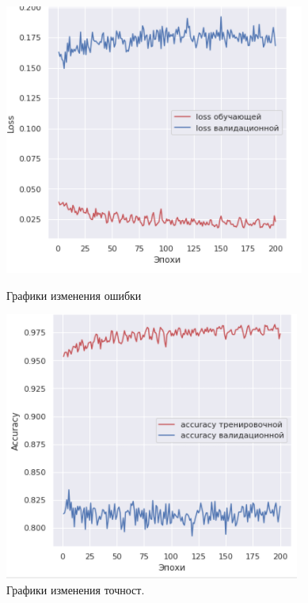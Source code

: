\documentclass[a4paper,14pt]{article}
\begin{document}
\begin{figure}[h]
\begin{center}
\begin{minipage}[h]{0.45\linewidth}
\includegraphics[width=1\linewidth]{pics/8.png}
\caption{Графики изменения ошибки}
\end{minipage}
\hfill
\begin{minipage}[h]{0.45\linewidth}
\includegraphics[width=1\linewidth]{pics/9.png}
\caption{Графики изменения точност.}
\end{minipage}
\end{center}
\end{figure}
\end{document}
